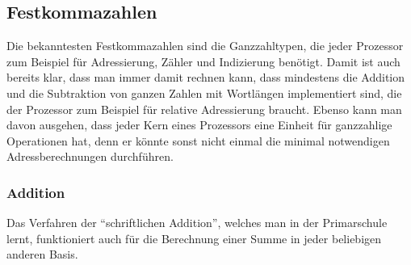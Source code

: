 %
%
\subsection{Festkommazahlen
\label{buch:subsection:integers}}
Die bekanntesten Festkommazahlen sind die Ganzzahltypen, die jeder
Prozessor zum Beispiel für Adressierung, Zähler und Indizierung
benötigt.
%
%
%
%
Damit ist auch bereits klar, dass man immer damit rechnen kann, dass
mindestens die Addition und die Subtraktion von ganzen Zahlen mit
Wortlängen implementiert sind, die der Prozessor zum Beispiel für
relative Adressierung braucht.
%
%
%
%
Ebenso kann man davon ausgehen, dass jeder Kern eines Prozessors
eine Einheit für ganzzahlige Operationen hat, denn er könnte sonst
nicht einmal die minimal notwendigen Adressberechnungen durchführen.

\subsubsection{Addition}
Das Verfahren der ``schriftlichen Addition'', welches man in der Primarschule
lernt, funktioniert auch für die Berechnung einer Summe in jeder beliebigen
anderen Basis.
%
%

